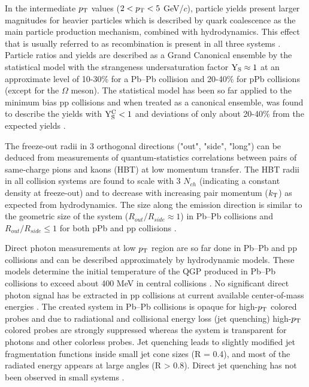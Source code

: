 \documentclass[../report.tex]{subfiles}
\begin{document}
In the intermediate $p_{\rm{T}}$ values ($2 < p_{\rm{T}} < 5 $ GeV/$c$), particle yields present larger magnitudes for heavier particles which is described by quark coalescence as the main particle production mechanism, combined with hydrodynamics. This effect that is usually referred to as recombination is present in all three systems \cite{Andrei:2014vaa,Abelev:2013xaa,Abelev:2013haa,Abelev:2014uua,Khachatryan:2016yru,Adam:2015jca,Adam:2016dau,Adam:2017zbf}. Particle ratios and yields are described as a Grand Canonical ensemble by the statistical model with the strangeness undersaturation factor $\rm{Y}_{S}\approx 1$ at an approximate level of 10-30\% for a Pb--Pb collision and 20-40\% for pPb collisions (except for the $\Omega$ meson). The statistical model has been so far applied to the minimum bias pp collisions and when treated as a canonical ensemble, was found to describe the yields with $\rm{Y}^{C}_{S} < 1$ and deviations of only about 20-40\% from the expected yields \cite{Adam:2016emw,Adam:2016bpr,Adam:2015vsf,ABELEV:2013zaa}. 

The freeze-out radii in 3 orthogonal directions ("out", "side", "long") can be deduced from measurements of quantum-statistics correlations between pairs of same-charge pions and kaons (HBT) at low momentum transfer. The HBT radii in all collision systems are found to scale with 3 $N_{ch}$ (indicating a constant density at freeze-out) and to decrease with increasing pair momentum ($k_{\rm{T}}$) as expected from hydrodynamics. The size along the emission direction is similar to the geometric size of the system ($R_{out}/R_{side} \approx 1$) in Pb--Pb collisions and $R_{out}/R_{side} \leq 1$ for both pPb and pp collisions \cite{Adam:2015vna,Adam:2015vja,Abelev:2014pja,Adam:2015pya,Aamodt:2011kd,CMS:2014mla,ATLAS:2015-054,Acharya:2017qtq,Aaboud:2017xpw}.

Direct photon measurements at low $p_{\rm{T}}$ region are so far done in Pb--Pb and pp collisions and can be described approximately by hydrodynamic models. These models determine the initial temperature of the QGP produced in Pb--Pb collisions to exceed about 400 MeV in central collisions \cite{Adam:2015lda}. No significant direct photon signal has be extracted in pp collisions at current available center-of-mass energies \cite{Acharya:2018dqe}. The created system in Pb--Pb collisions is opaque for high-$p_{\rm{T}}$ colored probes and due to radiational and collisional energy loss (jet quenching) high-$p_{\rm{T}}$ colored probes are strongly suppressed whereas the system is transparent for photons and other colorless probes. Jet quenching leads to slightly modified jet fragmentation functions inside small jet cone sizes (R = 0.4), and most of the radiated energy appears at large angles (R > 0.8). Direct jet quenching has not been observed in small systems \cite{Aad:2010bu,Aamodt:2010jd,Chatrchyan:2011sx,CMS:2012aa,Abelev:2012hxa,ALICE:2012ab,Aad:2014bxa,Adam:2015ewa,Aad:2015wga,Adam:2016jfp,Adam:2016xbp,Sirunyan:2017jic,Sirunyan:2016fcs,Sirunyan:2018jqr,Sirunyan:2018jju,Sirunyan:2018qec,Sirunyan:2017qhf,Khachatryan:2016tfj,Sirunyan:2017bsd,Aaboud:2017bzv,Aaboud:2017eww}. 
\end{document}
